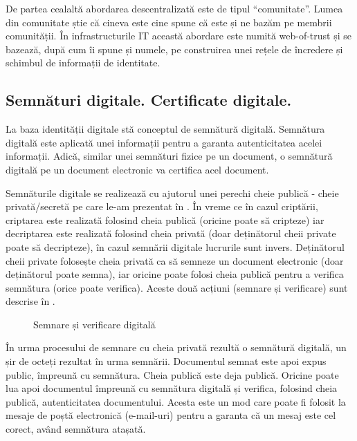 De partea cealaltă abordarea descentralizată este de tipul “comunitate”. Lumea din comunitate știe că cineva este cine spune că este și ne bazăm pe membrii comunității. În infrastructurile IT această abordare este numită web-of-trust și se bazează, după cum îi spune și numele, pe construirea unei rețele de încredere și schimbul de informații de identitate.

\subsection{Semnături digitale. Certificate digitale.}
\label{sec:sec:sign}

La baza identității digitale stă conceptul de semnătură digitală. Semnătura digitală este aplicată unei informații pentru a garanta autenticitatea acelei informații. Adică, similar unei semnături fizice pe un document, o semnătură digitală pe un document electronic va certifica acel document.

Semnăturile digitale se realizează cu ajutorul unei perechi cheie publică - cheie privată/secretă pe care le-am prezentat în . În vreme ce în cazul criptării, criptarea este realizată folosind cheia publică (oricine poate să cripteze) iar decriptarea este realizată folosind cheia privată (doar deținătorul cheii private poate să decripteze), în cazul semnării digitale lucrurile sunt invers. Deținătorul cheii private folosește cheia privată ca să semneze un document electronic (doar deținătorul poate semna), iar oricine poate folosi cheia publică pentru a verifica semnătura (orice poate verifica). Aceste două acțiuni (semnare și verificare) sunt descrise în .

\begin{figure}[htbp]
  \centering
  \def\svgwidth{\columnwidth}
  
  \caption{Semnare și verificare digitală}
  \label{fig:sec:sign}
\end{figure}

În urma procesului de semnare cu cheia privată rezultă o semnătură digitală, un șir de octeți rezultat în urma semnării. Documentul semnat este apoi expus public, împreună cu semnătura. Cheia publică este deja publică. Oricine poate lua apoi documentul împreună cu semnătura digitală și verifica, folosind cheia publică, autenticitatea documentului. Acesta este un mod care poate fi folosit la mesaje de poștă electronică (e-mail-uri) pentru a garanta că un mesaj este cel corect, având semnătura atașată.

